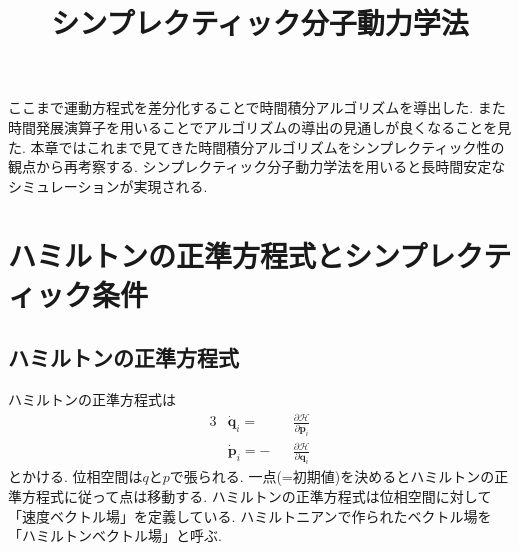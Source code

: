 





\title{シンプレクティック分子動力学法}
\maketitle

ここまで運動方程式を差分化することで時間積分アルゴリズムを導出した. 
また時間発展演算子を用いることでアルゴリズムの導出の見通しが良くなることを見た. 
本章ではこれまで見てきた時間積分アルゴリズムをシンプレクティック性の観点から再考察する. 
シンプレクティック分子動力学法を用いると長時間安定なシミュレーションが実現される. 

\section{ハミルトンの正準方程式とシンプレクティック条件}
\subsection{ハミルトンの正準方程式}
ハミルトンの正準方程式は
\begin{alignat}{3}
 & \dot{\bm{q}}_{i}
 =&& \frac{\partial \mathcal{H}}{\partial \bm{p}_{i}}
 \\
 & \dot{\bm{p}}_{i}
 =-&&\frac{\partial \mathcal{H}}{\partial \bm{q}_{i}}
\end{alignat}
とかける. 
位相空間は$q$と$p$で張られる. 
一点(=初期値)を決めるとハミルトンの正準方程式に従って点は移動する. 
ハミルトンの正準方程式は位相空間に対して「速度ベクトル場」を定義している. 
ハミルトニアンで作られたベクトル場を「ハミルトンベクトル場」と呼ぶ. 

